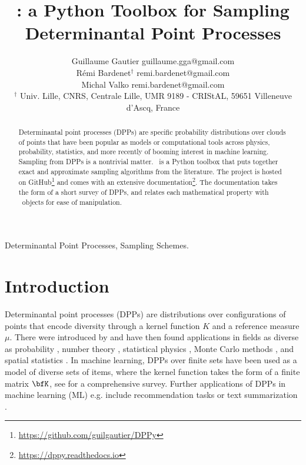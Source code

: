 \documentclass[twoside,11pt]{article}
\begin{document}
\title{\DPPy: a Python Toolbox for Sampling\\Determinantal Point Processes}

\author{\name Guillaume Gautier \email guillaume.gga@gmail.com \\
       \name R\'emi Bardenet$^\dagger$ \email remi.bardenet@gmail.com \\
       \name Michal Valko \email remi.bardenet@gmail.com \\
       \addr $^\dagger$ Univ. Lille, CNRS, Centrale Lille, UMR 9189 - CRIStAL, 59651 Villeneuve d’Ascq, France
}

\editor{}

\maketitle

\setcounter{footnote}{3}
\begin{abstract}%

  Determinantal point processes (DPPs) are specific probability distributions over clouds of points that have been popular as models or computational tools across physics, probability, statistics, and more recently of booming interest in machine learning.
  Sampling from DPPs is a nontrivial matter. \DPPy\ is a Python toolbox that puts together exact and approximate sampling algorithms from the literature.
  The project is hosted on GitHub\footnote{\url{https://github.com/guilgautier/DPPy}} and comes with an extensive documentation\footnote{\label{fn:docs}\url{https://dppy.readthedocs.io}}. The documentation takes the form of a short survey of DPPs, and relates each mathematical property with \DPPy\ objects for ease of manipulation.

\end{abstract}

\begin{keywords}
  Determinantal Point Processes, Sampling Schemes.
\end{keywords}

\section{Introduction} %
\label{sec:introduction}

  Determinantal point processes (DPPs) are distributions over configurations of points that encode diversity through a kernel function $K$ and a reference measure $\mu$.
  There were introduced by \citet{Mac75} and have then found applications in fields as diverse as probability \citep{Sos00, Kon05, HKPV06}, number theory \citep{RuSa96}, statistical physics \citep{PaBe11}, Monte Carlo methods \citep{BaHa16}, and spatial statistics \citep{LaMoRu15}.
  In machine learning, DPPs over finite sets have been used as a model of diverse sets of items, where the kernel function takes the form of a finite matrix $\bfK$, see \citep{KuTa12} for a comprehensive survey.
  Further applications of DPPs in machine learning (ML) e.g. include recommendation tasks \citep{KaDeKo16, GaPaKo16} or text summarization \citep{DuBa18}.\\
\end{document}
